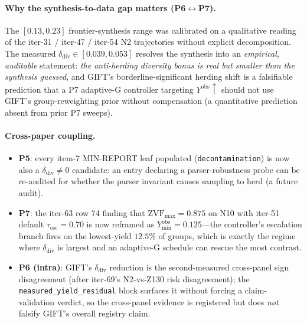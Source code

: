 \documentclass{article}
\begin{document}
\paragraph{Why the synthesis-to-data gap matters (P6$\leftrightarrow$P7).}
The $[0.13, 0.23]$ frontier-synthesis range was calibrated on a
qualitative reading of the iter-31 / iter-47 / iter-54 N2 trajectories
without explicit decomposition. The measured
$\delta_{\mathrm{div}}\in[0.039, 0.053]$ resolves the synthesis into
an \emph{empirical, auditable} statement: \emph{the anti-herding
diversity bonus is real but smaller than the synthesis guessed}, and
GIFT's borderline-significant herding shift is a falsifiable
prediction that a P7 adaptive-G controller targeting
$Y^{\mathrm{obs}}\uparrow$ should not use GIFT's group-reweighting
prior without compensation (a quantitative prediction absent from
prior P7 sweeps).

\paragraph{Cross-paper coupling.}
\begin{itemize}
  \item \textbf{P5}: every item-7 MIN-REPORT leaf populated
        (\texttt{decontamination}) is now also a
        $\delta_{\mathrm{div}}\neq 0$ candidate: an entry declaring a
        parser-robustness probe can be re-audited for whether the
        parser invariant causes sampling to herd (a future audit).
  \item \textbf{P7}: the iter-63 row 74 finding that
        $\mathrm{ZVF}_{\max}=0.875$ on N10 with iter-51 default
        $\tau_{\mathrm{esc}}=0.70$ is now reframed as
        $Y^{\mathrm{obs}}_{\min}=0.125$---the controller's
        escalation branch fires on the lowest-yield $12.5\%$ of
        groups, which is exactly the regime where $\delta_{\mathrm{div}}$
        is largest and an adaptive-G schedule can rescue the most
        contrast.
  \item \textbf{P6 (intra)}: GIFT's $\delta_{\mathrm{div}}$ reduction
        is the second-measured cross-panel sign disagreement (after
        iter-69's N2-vs-Z130 risk disagreement); the
        \texttt{measured\_yield\_residual} block surfaces it without
        forcing a claim-validation verdict, so the cross-panel
        evidence is registered but does \emph{not} falsify GIFT's
        overall registry claim.
\end{itemize}
\end{document}
